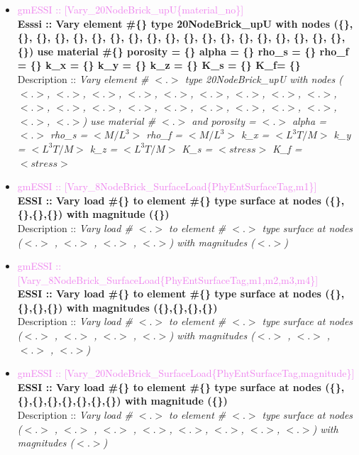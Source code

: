 \documentclass[11pt]{article}
\begin{document}
\begin{itemize}
  \item \textcolor{violet}{gmESSI :: [Vary\_20NodeBrick\_upU\{material\_no\}]} \\     
  \textbf{Esssi :: Vary element \#\{\} type 20NodeBrick\_upU with nodes (\{\}, \{\}, \{\}, \{\}, \{\}, \{\}, \{\}, \{\}, \{\}, \{\}, \{\}, \{\}, \{\}, \{\}, \{\}, \{\}, \{\}, \{\}, \{\}, \{\}) use material \#\{\} porosity = \{\} alpha = \{\} rho\_s = \{\} rho\_f = \{\} k\_x = \{\} k\_y = \{\} k\_z = \{\} K\_s = \{\} K\_f= \{\}}\\
  Description :: \textit{ Vary element \# $<.>$ type 20NodeBrick\_upU with nodes ($<.>$, $<.>$, $<.>$, $<.>$, $<.>$, $<.>$, $<.>$, $<.>$, $<.>$, $<.>$, $<.>$, $<.>$, $<.>$, $<.>$, $<.>$, $<.>$, $<.>$, $<.>$, $<.>$, $<.>$) use material \# $<.>$ and porosity = $<.>$ alpha = $<.>$  rho\_s = $<M/L^3>$  rho\_f = $<M/L^3>$ k\_x = $<L^3T/M>$  k\_y = $<L^3T/M>$  k\_z = $<L^3T/M>$  K\_s = $<stress>$ K\_f = $<stress>$}

  \item \textcolor{violet} {gmESSI :: [Vary\_8NodeBrick\_SurfaceLoad\{PhyEntSurfaceTag,m1\}]}\\                      
  \textbf{ESSI :: Vary load \#\{\} to element \#\{\} type surface at nodes (\{\},\{\},\{\},\{\}) with magnitude (\{\})}\\
  Description :: \textit{Vary load \# $<.>$ to element \# $<.>$ type surface at nodes ($<.>$ , $<.>$ , $<.>$ , $<.>$) with magnitudes ($<.>$)}

  \item \textcolor{violet} {gmESSI :: [Vary\_8NodeBrick\_SurfaceLoad\{PhyEntSurfaceTag,m1,m2,m3,m4\}]}\\                         
  \textbf{ESSI :: Vary load \#\{\} to element \#\{\} type surface at nodes (\{\},\{\},\{\},\{\}) with magnitudes (\{\},\{\},\{\},\{\})}\\
  Description :: \textit{Vary load \# $<.>$ to element \# $<.>$ type surface at nodes ($<.>$ , $<.>$ , $<.>$ , $<.>$) with magnitudes ($<.>$ , $<.>$ , $<.>$ , $<.>$)}

  \item \textcolor{violet} {gmESSI :: [Vary\_20NodeBrick\_SurfaceLoad\{PhyEntSurfaceTag,magnitude\}]}\\              
  \textbf{ESSI :: Vary load \#\{\} to element \#\{\} type surface at nodes (\{\},\{\},\{\},\{\},\{\},\{\},\{\},\{\}) with magnitude (\{\})}\\
  Description :: \textit{Vary load \# $<.>$ to element \# $<.>$ type surface at nodes ($<.>$ , $<.>$ , $<.>$ , $<.>$, $<.>$, $<.>$, $<.>$, $<.>$) with magnitudes ($<.>$)}


\end{itemize}
\end{document}
